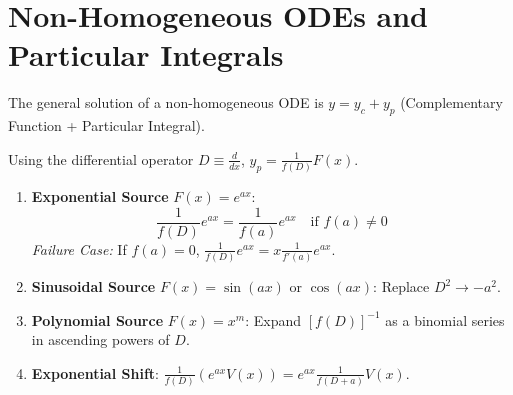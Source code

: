 \documentclass[11pt, a4paper, openany, oneside]{book}
\begin{document}
\section{Non-Homogeneous ODEs and Particular Integrals}

The general solution of a non-homogeneous ODE is $y = y_c + y_p$ (Complementary Function + Particular Integral).

Using the differential operator $D \equiv \frac{d}{dx}$, $y_p = \frac{1}{f(D)} F(x)$.

\begin{summarybox}
\begin{enumerate}[leftmargin=0.6cm]
\item \textbf{Exponential Source} $F(x) = e^{ax}$:
    \[ \frac{1}{f(D)} e^{ax} = \frac{1}{f(a)} e^{ax} \quad \text{if } f(a) \neq 0 \]
    \textit{Failure Case:} If $f(a) = 0$, $\frac{1}{f(D)} e^{ax} = x \frac{1}{f'(a)} e^{ax}$.
\item \textbf{Sinusoidal Source} $F(x) = \sin(ax)$ or $\cos(ax)$: Replace $D^2 \to -a^2$.
\item \textbf{Polynomial Source} $F(x) = x^m$: Expand $[f(D)]^{-1}$ as a binomial series in ascending powers of $D$.
\item \textbf{Exponential Shift}: $\frac{1}{f(D)}\left( e^{ax} V(x) \right) = e^{ax} \frac{1}{f(D+a)} V(x)$.
\end{enumerate}
\end{summarybox}
\end{document}

